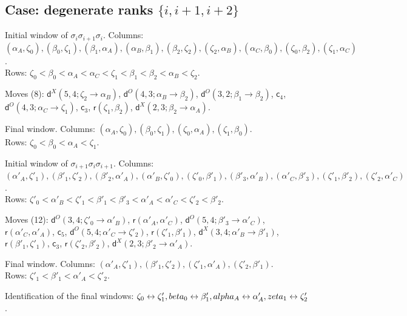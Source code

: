 \documentclass[11pt]{amsart}
\theoremstyle{definition}
\theoremstyle{remark}
\begin{document}
\subsection*{Case: degenerate ranks \texorpdfstring{$\{i,i+1,i+2\}$}{i,i+1,i+2}}
\noindent Initial window of $\sigma_i\sigma_{i+1}\sigma_i$. Columns: $(\alpha_A,\zeta_0),\allowbreak (\beta_0,\zeta_1),\allowbreak (\beta_1,\alpha_A),\allowbreak (\alpha_B,\beta_1),\allowbreak (\beta_2,\zeta_2),\allowbreak (\zeta_2,\alpha_B),\allowbreak (\alpha_C,\beta_0),\allowbreak (\zeta_0,\beta_2),\allowbreak (\zeta_1,\alpha_C)$.\\ Rows: $\zeta_0 <\allowbreak \beta_0 <\allowbreak \alpha_A <\allowbreak \alpha_C <\allowbreak \zeta_1 <\allowbreak \beta_1 <\allowbreak \beta_2 <\allowbreak \alpha_B <\allowbreak \zeta_2$.\par
\noindent Moves (8): $\mathsf{d}^{X}(5,4;\zeta_2\to\alpha_B)$, $\mathsf{d}^{O}(4,3;\alpha_B\to\beta_2)$, $\mathsf{d}^{O}(3,2;\beta_1\to\beta_2)$, $\mathsf{c}_{4}$, $\mathsf{d}^{O}(4,3;\alpha_C\to\zeta_1)$, $\mathsf{c}_{3}$, $\mathsf{r}(\zeta_1,\beta_2)$, $\mathsf{d}^{X}(2,3;\beta_2\to\alpha_A)$.\par
\noindent Final window. Columns: $(\alpha_A,\zeta_0),\allowbreak (\beta_0,\zeta_1),\allowbreak (\zeta_0,\alpha_A),\allowbreak (\zeta_1,\beta_0)$.\\ Rows: $\zeta_0 <\allowbreak \beta_0 <\allowbreak \alpha_A <\allowbreak \zeta_1$.\par\medskip
\noindent Initial window of $\sigma_{i+1}\sigma_i\sigma_{i+1}$. Columns: $(\alpha'_A,\zeta'_1),\allowbreak (\beta'_1,\zeta'_2),\allowbreak (\beta'_2,\alpha'_A),\allowbreak (\alpha'_B,\zeta'_0),\allowbreak (\zeta'_0,\beta'_1),\allowbreak (\beta'_3,\alpha'_B),\allowbreak (\alpha'_C,\beta'_3),\allowbreak (\zeta'_1,\beta'_2),\allowbreak (\zeta'_2,\alpha'_C)$.\\ Rows: $\zeta'_0 <\allowbreak \alpha'_B <\allowbreak \zeta'_1 <\allowbreak \beta'_1 <\allowbreak \beta'_3 <\allowbreak \alpha'_A <\allowbreak \alpha'_C <\allowbreak \zeta'_2 <\allowbreak \beta'_2$.\par
\noindent Moves (12): $\mathsf{d}^{O}(3,4;\zeta'_0\to\alpha'_B)$, $\mathsf{r}(\alpha'_A,\alpha'_C)$, $\mathsf{d}^{O}(5,4;\beta'_3\to\alpha'_C)$, $\mathsf{r}(\alpha'_C,\alpha'_A)$, $\mathsf{c}_{5}$, $\mathsf{d}^{O}(5,4;\alpha'_C\to\zeta'_2)$, $\mathsf{r}(\zeta'_1,\beta'_1)$, $\mathsf{d}^{X}(3,4;\alpha'_B\to\beta'_1)$, $\mathsf{r}(\beta'_1,\zeta'_1)$, $\mathsf{c}_{3}$, $\mathsf{r}(\zeta'_2,\beta'_2)$, $\mathsf{d}^{X}(2,3;\beta'_2\to\alpha'_A)$.\par
\noindent Final window. Columns: $(\alpha'_A,\zeta'_1),\allowbreak (\beta'_1,\zeta'_2),\allowbreak (\zeta'_1,\alpha'_A),\allowbreak (\zeta'_2,\beta'_1)$.\\ Rows: $\zeta'_1 <\allowbreak \beta'_1 <\allowbreak \alpha'_A <\allowbreak \zeta'_2$.\par\medskip
\noindent Identification of the final windows: $\zeta_0\leftrightarrow \zeta'_1,\allowbreak \\beta_0\leftrightarrow \beta'_1,\allowbreak \\alpha_A\leftrightarrow \alpha'_A,\allowbreak \\zeta_1\leftrightarrow \zeta'_2$.\par\bigskip
\end{document}
